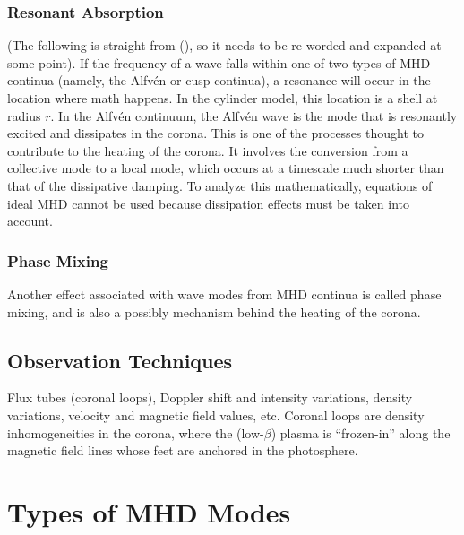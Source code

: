 \documentclass[preprint2]{aastex}
\begin{document}
\subsubsection{Resonant Absorption}
(The following is straight from (\cite{Nak}), so it needs to be
re-worded and expanded at some point).
If the frequency of a wave falls within one of two types of MHD
continua (namely, the Alfv\'en or cusp continua), a resonance will
occur in the location where math happens.
In the cylinder model, this location is a shell at radius $r$.
In the Alfv\'en continuum, the Alfv\'en wave is the mode that is
resonantly excited and dissipates in the corona.
This is one of the processes thought to contribute to the heating
of the corona. It involves the conversion from a collective mode
to a local mode, which occurs at a timescale much shorter than that
of the dissipative damping.
To analyze this mathematically, equations of ideal MHD cannot be used
because dissipation effects must be taken into account.

\subsubsection{Phase Mixing}
Another effect associated with wave modes from MHD continua is called
phase mixing, and is also a possibly mechanism behind the heating of
the corona.
\subsection{Observation Techniques}
Flux tubes (coronal loops), Doppler shift and intensity variations,
density variations, velocity and magnetic field values,
etc. Coronal loops are density inhomogeneities in the corona,
where the (low-$\beta$) plasma is ``frozen-in'' along the magnetic
field lines whose feet are anchored in the photosphere.
\section{Types of MHD Modes}\label{topics}
\end{document}
